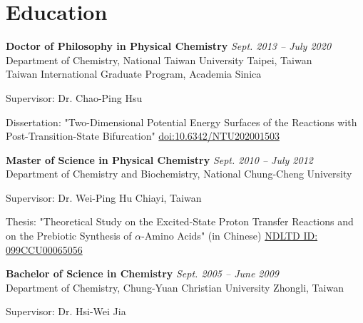 \section{\sc Education}




{\bf Doctor of Philosophy in Physical Chemistry} \hfill \textit{Sept. 2013 -- July 2020} \\
Department of Chemistry, National Taiwan University \hfill Taipei, Taiwan\\
Taiwan International Graduate Program, Academia Sinica \\
\vspace*{-.15in}
\begin{list1}
    \item[] Supervisor: Dr. Chao-Ping Hsu 
    \item[] Dissertation: "Two-Dimensional Potential Energy Surfaces of the Reactions with Post-Transition-State Bifurcation" \hfill \footnotesize{\href{https://doi.org/10.6342/NTU202001503}{doi:10.6342/NTU202001503}}
\end{list1}

{\bf Master of Science in Physical Chemistry} \hfill \textit{Sept. 2010 -- July 2012}\\
Department of Chemistry and Biochemistry, National Chung-Cheng University \\
\vspace*{-.15in}
\begin{list1}
    \item[] Supervisor: Dr. Wei-Ping Hu \hfill Chiayi, Taiwan 
    \item[] Thesis: "Theoretical Study on the Excited-State Proton Transfer Reactions and on the Prebiotic Synthesis of $\alpha$-Amino Acids" (in Chinese) \hfill \footnotesize{\href{https://hdl.handle.net/11296/nf4k4r}{NDLTD ID: 099CCU00065056}}
\end{list1}


{\bf Bachelor of Science in Chemistry} \hfill \textit{Sept. 2005 -- June 2009}\\
Department of Chemistry, Chung-Yuan Christian University \hfill Zhongli, Taiwan \\
\vspace*{-.15in}
\begin{list1}
    \item[] Supervisor: Dr. Hsi-Wei Jia
\end{list1}

\endinput